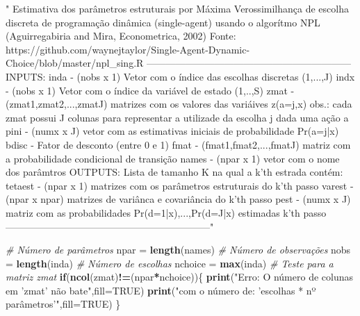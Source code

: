 \documentclass[12pt,a4paper]{article}
\newenvironment{Shaded}{\begin{snugshade}}{\end{snugshade}}
\newcommand{\CommentTok}[1]{\textcolor[rgb]{0.56,0.35,0.01}{\textit{#1}}}
\newcommand{\ControlFlowTok}[1]{\textcolor[rgb]{0.13,0.29,0.53}{\textbf{#1}}}
\newcommand{\DataTypeTok}[1]{\textcolor[rgb]{0.13,0.29,0.53}{#1}}
\newcommand{\KeywordTok}[1]{\textcolor[rgb]{0.13,0.29,0.53}{\textbf{#1}}}
\newcommand{\NormalTok}[1]{#1}
\newcommand{\OperatorTok}[1]{\textcolor[rgb]{0.81,0.36,0.00}{\textbf{#1}}}
\newcommand{\OtherTok}[1]{\textcolor[rgb]{0.56,0.35,0.01}{#1}}
\newcommand{\StringTok}[1]{\textcolor[rgb]{0.31,0.60,0.02}{#1}}
\begin{document}
\begin{Shaded}
\begin{Highlighting}[]
{{{{{{{{{  \StringTok{"}
\StringTok{  Estimativa dos parâmetros estruturais por Máxima Verossimilhança }
\StringTok{  de escolha discreta de programação dinâmica (single-agent)}
\StringTok{  usando o algorítmo NPL (Aguirregabiria and Mira, Econometrica, 2002)}
\StringTok{  }
\StringTok{  Fonte: https://github.com/waynejtaylor/Single-Agent-Dynamic-Choice/blob/master/npl_sing.R }
\StringTok{   }
\StringTok{  ---------------------------------------------------------------}
\StringTok{  }
\StringTok{  INPUTS:}
\StringTok{    inda    - (nobs x 1) Vetor com o índice das escolhas }
\StringTok{    discretas (1,...,J)}
\StringTok{  }
\StringTok{    indx    - (nobs x 1) Vetor com o índice da variável }
\StringTok{    de estado (1,..,S)}
\StringTok{  }
\StringTok{    zmat    - (zmat1,zmat2,...,zmatJ) matrizes com os }
\StringTok{    valores das variáives}
\StringTok{              z(a=j,x)}
\StringTok{            obs.: cada zmat possui J colunas}
\StringTok{            para representar a utilizade da escolha j}
\StringTok{            dada uma ação a}
\StringTok{  }
\StringTok{    pini    - (numx x J) vetor com as }
\StringTok{    estimativas iniciais de probabilidade Pr(a=j|x)}
\StringTok{  }
\StringTok{    bdisc   - Fator de desconto (entre 0 e 1)}
\StringTok{  }
\StringTok{    fmat    - (fmat1,fmat2,...,fmatJ) matriz com}
\StringTok{    a probabilidade condicional de transição}
\StringTok{  }
\StringTok{    names   - (npar x 1) vetor com o nome dos parâmtros}
\StringTok{  }
\StringTok{   OUTPUTS:}
\StringTok{    Lista de tamanho K na qual a k'th estrada contém:}
\StringTok{    }
\StringTok{    tetaest - (npar x 1) matrizes com os parâmetros estruturais }
\StringTok{    do k'th passo}
\StringTok{  }
\StringTok{    varest  - (npar x npar) matrizes de variânca e covariância }
\StringTok{    do k'th passo}
\StringTok{  }
\StringTok{    pest    - (numx x J) matriz com as probabilidades}
\StringTok{    Pr(d=1|x),...,Pr(d=J|x) estimadas k'th passo}
\StringTok{  ---------------------------------------------------------------"}
  
  \CommentTok{# Número de parâmetros}
\NormalTok{  npar =}\StringTok{ }\KeywordTok{length}\NormalTok{(names)}
  \CommentTok{# Número de observações}
\NormalTok{  nobs =}\StringTok{ }\KeywordTok{length}\NormalTok{(inda)}
  \CommentTok{# Número de escolhas}
\NormalTok{  nchoice =}\StringTok{ }\KeywordTok{max}\NormalTok{(inda)}
  \CommentTok{# Teste para a matriz zmat}
  \ControlFlowTok{if}\NormalTok{(}\KeywordTok{ncol}\NormalTok{(zmat)}\OperatorTok{!=}\NormalTok{(npar}\OperatorTok{*}\NormalTok{nchoice))\{}
    \KeywordTok{print}\NormalTok{(}\StringTok{"Erro: O número de colunas em 'zmat' não bate"}\NormalTok{,}\DataTypeTok{fill=}\OtherTok{TRUE}\NormalTok{)}
    \KeywordTok{print}\NormalTok{(}\StringTok{"com o número de: 'escolhas * nº parâmetros'"}\NormalTok{,}\DataTypeTok{fill=}\OtherTok{TRUE}\NormalTok{)}
\NormalTok{  \}}
  
}}}}}}}}}
\end{Highlighting}
\end{Shaded}
\end{document}
